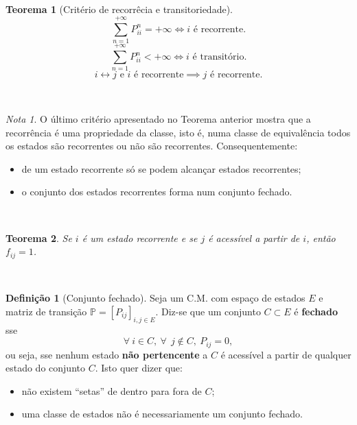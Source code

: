 \documentclass[
  11pt,
  a4paper,
]{book}
\newtheorem{theorem}{Teorema}[chapter]
\theoremstyle{definition}
\newtheorem{definition}{Definição}[chapter]
\theoremstyle{definition}
\theoremstyle{definition}
\theoremstyle{definition}
\theoremstyle{remark}
\newtheorem*{remark}{Nota }
\begin{document}
\(\,\)

\begin{theorem}[Critério de recorrêcia e transitoriedade]
\[\sum\limits_{n=1}^{+\infty}P_{ii}^n=+\infty \iff i \text{ é recorrente}.\]
\[\sum\limits_{n=1}^{+\infty}P_{ii}^n<+\infty \iff i \text{ é transitório}.\]
\[i \longleftrightarrow j \text{ e } i \text{ é recorrente}\implies j \text{ é recorrente}.\]
\end{theorem}

\(\,\)

\begin{remark}

O último critério apresentado no Teorema anterior mostra que a recorrência é uma propriedade da classe, isto é, numa classe de equivalência todos os estados são recorrentes ou não são recorrentes. Consequentemente:

\begin{itemize}
\item
  de um estado recorrente só se podem alcançar estados recorrentes;
\item
  o conjunto dos estados recorrentes forma num conjunto fechado.
\end{itemize}

\end{remark}

\(\,\)

\begin{theorem}
Se \(i\) é um estado recorrente e se \(j\) é acessível a partir de \(i\), então \(f_{ij}=1\).
\end{theorem}

\(\,\)

\begin{definition}[Conjunto fechado]

Seja um C.M. com espaço de estados \(E\) e matriz de transição \(\mathbb{P}=[P_{ij}]_{i,j \in E}\). Diz-se que um conjunto \(C \subset E\) é \textbf{fechado} sse
\[\forall ~i \in C, ~\forall ~\ j \notin C, ~P_{ij}=0,\]
ou seja, sse nenhum estado \textbf{não pertencente} a \(C\) é acessível a partir de qualquer estado do conjunto \(C\). Isto quer dizer que:

\begin{itemize}
\item
  não existem ``setas'' de dentro para fora de \(C\);
\item
  uma classe de estados não é necessariamente um conjunto fechado.
\end{itemize}

\end{definition}
\end{document}
